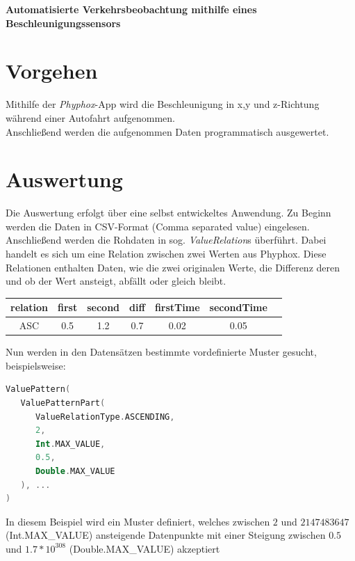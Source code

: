 \documentclass{article}
\begin{document}
\begin{center}
   \Large\textbf{Automatisierte Verkehrsbeobachtung mithilfe eines Beschleunigungssensors}
\end{center}
\begin{multicols*}{3}
   \section*{Vorgehen}
   Mithilfe der \emph{Phyphox}-App wird die Beschleunigung in x,y und z-Richtung während einer Autofahrt aufgenommen.\\
   Anschließend werden die aufgenommen Daten programmatisch ausgewertet.
   \section*{Auswertung}
   Die Auswertung erfolgt über eine selbst entwickeltes Anwendung. Zu Beginn werden die Daten in CSV-Format (Comma separated value) eingelesen.\\
   Anschließend werden die Rohdaten in sog. \emph{ValueRelation}s überführt. Dabei handelt es sich um eine Relation zwischen zwei Werten aus Phyphox.
   Diese Relationen enthalten Daten, wie die zwei originalen Werte, die Differenz deren und ob der Wert ansteigt, abfällt oder gleich bleibt.\\
   \begin{center}
      \captionsetup{justification=centering}
      \begin{tabular}{ c | c | c | c | c | c | c }
         relation & first & second & diff & firstTime & secondTime \\
         \hline
         ASC      & 0.5   & 1.2    & 0.7  & 0.02      & 0.05       \\
      \end{tabular}
      \label{fig:sample_ValueRelation}
   \end{center}
   Nun werden in den Datensätzen bestimmte vordefinierte Muster gesucht, beispielsweise:\\
   \begin{lstlisting}[language=Kotlin]
ValuePattern(
   ValuePatternPart(
      ValueRelationType.ASCENDING,
      2,
      Int.MAX_VALUE,
      0.5,
      Double.MAX_VALUE
   ), ...
)
        \end{lstlisting}
   In diesem Beispiel wird ein Muster definiert, welches zwischen $2$ und $2147483647$ (Int.MAX\_VALUE) ansteigende Datenpunkte
   mit einer Steigung zwischen $0.5$ und $1.7*10^{308}$ (Double.MAX\_VALUE) akzeptiert\\
   \begin{center}
      \captionsetup{justification=centering}
      \label{fig:sample_graphs}
   \end{center}
   \vfill\null
   \columnbreak

\end{multicols*}
\end{document}
